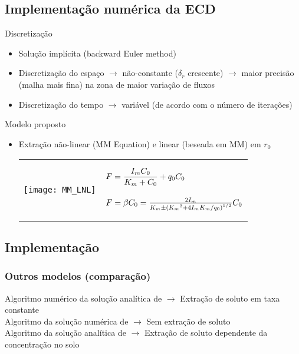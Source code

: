 \subsection{Implementação numérica da ECD}
\begin{frame}
  \begin{block}{Discretização}
  \begin{itemize}
    \item Solução implícita (backward Euler method)
    \item Discretização do espaço $\rightarrow$ não-constante ($\delta_r$ crescente) $\rightarrow$ maior precisão (malha mais fina) na zona de maior variação de fluxos
    \item Discretização do tempo $\rightarrow$ variável (de acordo com o número de iterações)
  \end{itemize}
  \end{block} \pause
  
  \begin{block}{Modelo proposto}
    \begin{itemize}
      \item Extração não-linear (MM Equation) e linear (beseada em MM) em $r_0$\\
	\begin{tabular}{ll}
	  \multirow{8}{*}{\texttt{[image: MM\_LNL]}} & \\
								  & \\
								  & $F = \displaystyle{I_m C_0 \over K_m + C_0} + q_0 C_0 $ \\
								  & \\
								  & \\
								  & $F = \beta C_0 = {2 I_m \over K_m \pm \left( {K_m}^2 + 4{I_m K_m / q_0} \right)^{1/2}} C_0 $ \\
								  & \\
								  & \\
	\end{tabular}
    \end{itemize}
  \end{block}
\end{frame}

\subsection{Implementação}
\begin{frame}\frametitle{Outros modelos (comparação)}
  Algoritmo numérico da solução analítica de \cite{willigen1} $\rightarrow$ Extração de soluto em taxa constante \\[0.5cm]

  Algoritmo da solução numérica de \cite{liersolute} $\rightarrow$ Sem extração de soluto\\[.5cm]

  Algoritmo da solução analítica de \cite{cushman} $\rightarrow$ Extração de soluto dependente da concentração no solo

\end{frame}

